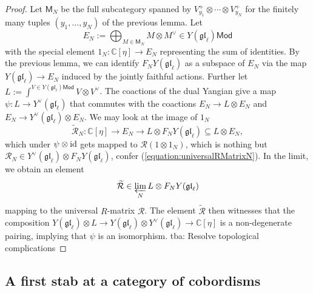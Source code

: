\documentclass[11pt]{report}
\theoremstyle{definition}
\theoremstyle{remark}
\theoremstyle{remark}
\newcommand{\id}{\textnormal{id}}
\newcommand{\C}{\mathbb{C}}
\begin{document}
\begin{proof}
Let $\mathsf{M}_N$ be the full subcategory spanned by $V_{y_1}^+ \otimes \cdots \otimes V_{y_N}^+$ for the finitely many tuples $(y_1,...,y_N)$ of the previous lemma. Let
\begin{equation*}
E_N := \bigoplus_{M \in \mathsf{M}_N} M \otimes M^\vee \in Y(\mathfrak{gl}_\ell)\mathsf{Mod}
\end{equation*}
with the special element $1_N: \C[\eta] \to E_N$ representing the sum of identities. By the previous lemma, we can identify $F_N Y(\mathfrak{gl}_\ell)$ as a subspace of $E_N$ via the map $Y(\mathfrak{gl}_\ell) \to E_N$ induced by the jointly faithful actions. Further let $L := \int^{V \in Y(\mathfrak{gl}_\ell)\mathsf{Mod}} V \otimes V^\vee$. The coactions of the dual Yangian give a map $\psi: L \to Y^\vee(\mathfrak{gl}_\ell)$ that commutes with the coactions $E_N \to L \otimes E_N$ and $E_N \to Y^\vee(\mathfrak{gl}_\ell) \otimes E_N$. We may look at the image of $1_N$
\begin{equation*}
\widetilde{\mathcal{R}}_N: \C[\eta] \to E_N \to L \otimes F_N Y(\mathfrak{gl}_\ell) \subseteq L \otimes E_N,
\end{equation*}
which under $\psi \otimes \id$ gets mapped to $\mathcal{R}(1 \otimes 1_N)$, which is nothing but $\mathcal{R}_N \in Y^\vee(\mathfrak{gl}_\ell) \otimes F_N Y(\mathfrak{gl}_\ell)$, confer (\ref{equation:universalRMatrixN}). In the limit, we obtain an element
\begin{equation*}
\widetilde{\mathcal{R}} \in \varprojlim_N L \otimes F_N Y(\mathfrak{gl}_\ell)
\end{equation*}
mapping to the universal $R$-matrix $\mathcal{R}$. The element $\widetilde{\mathcal{R}}$ then witnesses that the composition $Y(\mathfrak{gl}_\ell) \otimes L \to Y(\mathfrak{gl}_\ell) \otimes Y^\vee(\mathfrak{gl}_\ell) \to \C[\eta]$ is a non-degenerate pairing, implying that $\psi$ is an isomorphism. tba: Resolve topological complications
\end{proof}

\subsection{A first stab at a category of cobordisms}
\end{document}
